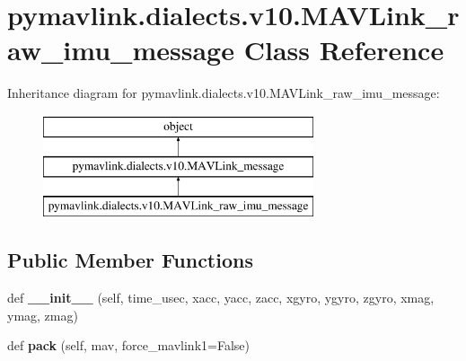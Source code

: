 \hypertarget{classpymavlink_1_1dialects_1_1v10_1_1MAVLink__raw__imu__message}{}\section{pymavlink.\+dialects.\+v10.\+M\+A\+V\+Link\+\_\+raw\+\_\+imu\+\_\+message Class Reference}
\label{classpymavlink_1_1dialects_1_1v10_1_1MAVLink__raw__imu__message}
Inheritance diagram for pymavlink.\+dialects.\+v10.\+M\+A\+V\+Link\+\_\+raw\+\_\+imu\+\_\+message\+:\begin{figure}[H]
\begin{center}
\leavevmode
\includegraphics[height=3.000000cm]{classpymavlink_1_1dialects_1_1v10_1_1MAVLink__raw__imu__message}
\end{center}
\end{figure}
\subsection*{Public Member Functions}
\begin{DoxyCompactItemize}
\item 
\mbox{\label{classpymavlink_1_1dialects_1_1v10_1_1MAVLink__raw__imu__message_aa60c66c43506d5adc3805bbcdb1aff16}} 
def {\bfseries \+\_\+\+\_\+init\+\_\+\+\_\+} (self, time\+\_\+usec, xacc, yacc, zacc, xgyro, ygyro, zgyro, xmag, ymag, zmag)
\item 
\mbox{\label{classpymavlink_1_1dialects_1_1v10_1_1MAVLink__raw__imu__message_aae7f6979dd104e6dc54e6871bdfe2b3a}} 
def {\bfseries pack} (self, mav, force\+\_\+mavlink1=False)
\end{DoxyCompactItemize}
